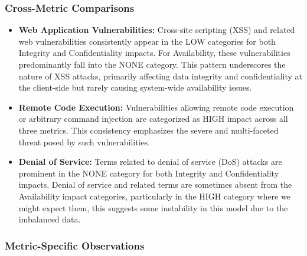 \documentclass[12pt]{article}
\begin{document}
\subsubsection{Cross-Metric Comparisons}

\begin{itemize}

	\item \textbf{Web Application Vulnerabilities:} Cross-site scripting (XSS) and related web
	      vulnerabilities consistently appear in the LOW categories for both Integrity and
	      Confidentiality impacts. For Availability, these vulnerabilities predominantly fall into the
	      NONE category. This pattern underscores the nature of XSS attacks, primarily affecting data
	      integrity and confidentiality at the client-side but rarely causing system-wide availability
	      issues.

	\item \textbf{Remote Code Execution:} Vulnerabilities allowing remote code execution or
	      arbitrary command injection are categorized as HIGH impact across all three metrics. This
	      consistency emphasizes the severe and multi-faceted threat posed by such vulnerabilities.

	\item \textbf{Denial of Service:} Terms related to denial of service (DoS) attacks are prominent
	      in the NONE category for both Integrity and Confidentiality impacts. Denial of service and
	      related terms are sometimes absent from the Availability impact categories, particularly in
	      the HIGH category where we might expect them, this suggests some instability in this model
	      due to the imbalanced data.

\end{itemize}

\subsubsection{Metric-Specific Observations}
\end{document}
